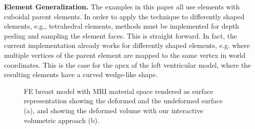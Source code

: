 \documentclass[journal]{vgtc}                %
\begin{document}
\noindent \textbf{Element Generalization.} The examples in this paper all use elements with cuboidal parent elements. In order to apply the technique to differently shaped elements, e.g., tetrahedral elements, methods must be implemented for depth peeling and sampling the element faces. This is straight forward. In fact, the current implementation already works for differently shaped elements, e.g. where multiple vertices of the parent element are mapped to the same vertex in world coordinates. This is the case for the apex of the left ventricular model, where the resulting elements have a curved wedge-like shape.  
%
\begin{figure}
    \centering 
    \caption{FE breast model with MRI material space rendered as surface representation showing the deformed and the undeformed surface (a), and showing the deformed volume with our interactive volumetric approach (b).}
    \label{fig:breast}
\end{figure}
%
\end{document}
